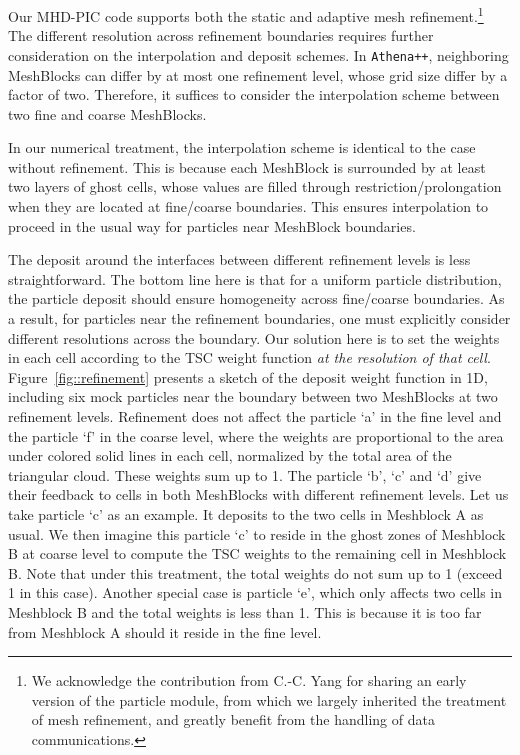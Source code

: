 \documentclass[fleqn,usenatbib]{mnras}
\begin{document}
Our MHD-PIC code supports both the static and adaptive mesh refinement.\footnote{We acknowledge the contribution from C.-C. Yang for sharing an early version of the particle module, from which we largely inherited the treatment of mesh refinement, and greatly benefit from the handling of data communications.} The different resolution across refinement boundaries requires further consideration on the interpolation and deposit schemes. In \texttt{Athena++}, neighboring MeshBlocks can differ by at most one refinement level, whose grid size differ by a factor of two. Therefore, it suffices to consider the interpolation scheme between two fine and coarse MeshBlocks.

In our numerical treatment, the interpolation scheme is identical to the case without refinement.
This is because each MeshBlock is surrounded by at least two layers of ghost cells, whose values are filled through restriction/prolongation when they are located at fine/coarse boundaries. This ensures interpolation to proceed in the usual way for particles near MeshBlock boundaries.

The deposit around the interfaces between different refinement levels is less straightforward. The bottom line here is that for
a uniform particle distribution, the particle deposit should ensure homogeneity across fine/coarse boundaries. As a result, for particles near the refinement boundaries, one must explicitly consider different resolutions across the boundary. Our solution here is to set the weights in each cell according to the TSC weight function {\it at the resolution of that cell}.
Figure~\ref{fig::refinement} presents a sketch of the deposit weight function in 1D, including six mock particles near the boundary between two MeshBlocks at two refinement levels.
Refinement does not affect the particle `a' in the fine level and the particle `f' in the coarse level, where the weights are proportional to the area under colored solid lines in each cell, normalized by the total area of the triangular cloud. These weights sum up to 1.
The particle `b', `c' and `d' give their feedback to cells in both MeshBlocks with different refinement levels. Let us take particle `c' as an example. It deposits to the two cells in Meshblock A as usual. We then imagine this particle `c' to reside in the ghost zones of Meshblock B at coarse level to compute the TSC weights to the remaining cell in Meshblock B. Note that under this treatment, the total weights do not sum up to 1 (exceed 1 in this case).
Another special case is particle `e', which only affects two cells in Meshblock B and the total weights is less than 1. This is because it is too far from Meshblock A should it reside in the fine level. 
\end{document}
